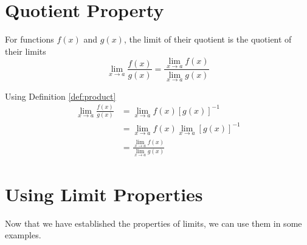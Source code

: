 \documentclass[working]{tuftebook}
\begin{document}
\section{Quotient Property}
\begin{definition}
    For functions $f(x)$ and $g(x)$, the limit of their quotient is the quotient of their limits 
    \[
        \lim_{x\to a} \frac{f(x)}{g(x)}= \frac{ \lim_{x\to a}f(x)}{ \lim_{x\to a}g(x)}
    \]
\end{definition}
\begin{myproof}
    Using Definition \ref{def:product}
    \begin{align*}
        \lim_{x\to a} \frac{f(x)}{g(x)}&= \lim_{x\to a}f(x)[g(x)]^{-1}\\
                                       &= \lim_{x\to a}f(x) \lim_{x\to a}[g(x)]^{-1}\\ 
                                       &= \frac{ \lim_{x\to a}f(x)}{ \lim_{x\to a}g(x)}
    \end{align*}
\end{myproof}

\section{Using Limit Properties}
Now that we have established the properties of limits, we can use them in some examples. 
\end{document}
